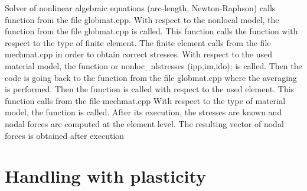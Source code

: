 Solver of nonlinear algebraic equations (arc-length, Newton-Raphson) calls function
 from the file {\sf globmat.cpp}.
\newline With respect to the nonlocal model, the function
 from the file {\sf globmat.cpp}
\newline is called. This function calls the function
\newline with respect to the type of finite element. The finite element calls
 from the file {\sf mechmat.cpp}
\newline in order to obtain correct stresses. With respect to the used material model, the function
 or {\sf nonloc\_nlstresses (ipp,im,ido);}
\newline is called. Then the code is going back to the function
 from the file {\sf globmat.cpp}
\newline where the averaging is performed. Then the function
\newline is called with respect to the used element. This function calls
 from the file {\sf mechmat.cpp}
\newline With respect to the type of material model, the function
\newline is called. After its execution, the stresses are known and nodal forces
are computed at the element level. The resulting vector of nodal forces is obtained
after execution



\section{Handling with plasticity}

